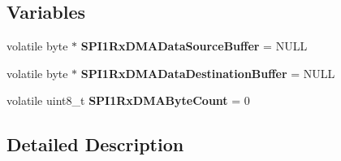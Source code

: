 \subsection*{Variables}
\begin{DoxyCompactItemize}
\item 
\hypertarget{group___d_m_a_t___s___s_p_i___r_x__module_ga5b50a0c5b8d84dafd387b0664af06823}{volatile byte $\ast$ {\bfseries S\-P\-I1\-Rx\-D\-M\-A\-Data\-Source\-Buffer} = N\-U\-L\-L}\label{group___d_m_a_t___s___s_p_i___r_x__module_ga5b50a0c5b8d84dafd387b0664af06823}

\item 
\hypertarget{group___d_m_a_t___s___s_p_i___r_x__module_ga18c5c8314d904371ab333cf8b5cafa3f}{volatile byte $\ast$ {\bfseries S\-P\-I1\-Rx\-D\-M\-A\-Data\-Destination\-Buffer} = N\-U\-L\-L}\label{group___d_m_a_t___s___s_p_i___r_x__module_ga18c5c8314d904371ab333cf8b5cafa3f}

\item 
\hypertarget{group___d_m_a_t___s___s_p_i___r_x__module_gafcfb011966b8fb6e4bf0efc759a1fe58}{volatile uint8\-\_\-t {\bfseries S\-P\-I1\-Rx\-D\-M\-A\-Byte\-Count} = 0}\label{group___d_m_a_t___s___s_p_i___r_x__module_gafcfb011966b8fb6e4bf0efc759a1fe58}

\end{DoxyCompactItemize}


\subsection{Detailed Description}


